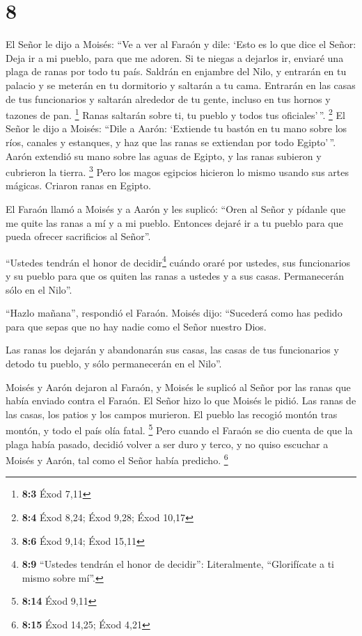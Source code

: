 \hypertarget{section-7}{%
\section{8}\label{section-7}}

 El Señor le dijo a Moisés: ``Ve a ver al Faraón y dile:
`Esto es lo que dice el Señor: Deja ir a mi pueblo, para que me adoren.
 Si te niegas a dejarlos ir, enviaré una plaga de ranas
por todo tu país.  Saldrán en enjambre del Nilo, y
entrarán en tu palacio y se meterán en tu dormitorio y saltarán a tu
cama. Entrarán en las casas de tus funcionarios y saltarán alrededor de
tu gente, incluso en tus hornos y tazones de pan. \footnote{\textbf{8:3}
  Éxod 7,11}  Ranas saltarán sobre ti, tu pueblo y todos
tus oficiales'\,''. \footnote{\textbf{8:4} Éxod 8,24; Éxod 9,28; Éxod
  10,17}  El Señor le dijo a Moisés: ``Dile a Aarón:
`Extiende tu bastón en tu mano sobre los ríos, canales y estanques, y
haz que las ranas se extiendan por todo Egipto'\,''. 
Aarón extendió su mano sobre las aguas de Egipto, y las ranas subieron y
cubrieron la tierra. \footnote{\textbf{8:6} Éxod 9,14; Éxod 15,11}
 Pero los magos egipcios hicieron lo mismo usando sus
artes mágicas. Criaron ranas en Egipto.

 El Faraón llamó a Moisés y a Aarón y les suplicó: ``Oren
al Señor y pídanle que me quite las ranas a mí y a mi pueblo. Entonces
dejaré ir a tu pueblo para que pueda ofrecer sacrificios al Señor''.

 ``Ustedes tendrán el honor de decidir\footnote{\textbf{8:9}
  ``Ustedes tendrán el honor de decidir'': Literalmente, ``Glorifícate a
  ti mismo sobre mí''.} cuándo oraré por ustedes, sus funcionarios y su
pueblo para que os quiten las ranas a ustedes y a sus casas.
Permanecerán sólo en el Nilo''.

 ``Hazlo mañana'', respondió el Faraón. Moisés dijo:
``Sucederá como has pedido para que sepas que no hay nadie como el Señor
nuestro Dios.

 Las ranas los dejarán y abandonarán sus casas, las casas
de tus funcionarios y detodo tu pueblo, y sólo permanecerán en el
Nilo''.

 Moisés y Aarón dejaron al Faraón, y Moisés le suplicó al
Señor por las ranas que había enviado contra el Faraón. 
El Señor hizo lo que Moisés le pidió. Las ranas de las casas, los patios
y los campos murieron.  El pueblo las recogió montón tras
montón, y todo el país olía fatal. \footnote{\textbf{8:14} Éxod 9,11}
 Pero cuando el Faraón se dio cuenta de que la plaga
había pasado, decidió volver a ser duro y terco, y no quiso escuchar a
Moisés y Aarón, tal como el Señor había predicho. \footnote{\textbf{8:15}
  Éxod 14,25; Éxod 4,21}

